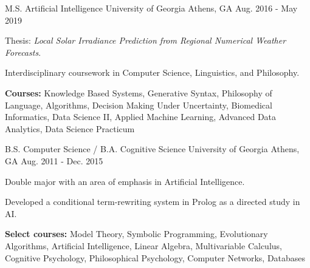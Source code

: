 \begin{cventries}

\cventry
{M.S. Artificial Intelligence}
{University of Georgia}
{Athens, GA}
{Aug. 2016 - May 2019}
{\begin{cvitems}
    \item {Thesis: \textit{Local Solar Irradiance Prediction from Regional Numerical Weather Forecasts}.}
    \item {Interdisciplinary coursework in Computer Science, Linguistics, and Philosophy.}
    \item {\textbf{Courses:} Knowledge Based Systems, Generative Syntax, Philosophy of Language, Algorithms, Decision Making Under Uncertainty, Biomedical Informatics, Data Science II, Applied Machine Learning, Advanced Data Analytics, Data Science Practicum}
\end{cvitems}}

\cventry
{B.S. Computer Science / B.A. Cognitive Science}
{University of Georgia}
{Athens, GA}
{Aug. 2011 - Dec. 2015}
{\begin{cvitems}
    \item {Double major with an area of emphasis in Artificial Intelligence.}
    \item {Developed a conditional term-rewriting system in Prolog as a directed study in AI.}
    \item {\textbf{Select courses:} Model Theory, Symbolic Programming, Evolutionary Algorithms, Artificial Intelligence, Linear Algebra, Multivariable Calculus, Cognitive Psychology, Philosophical Psychology, Computer Networks, Databases}
\end{cvitems}}

\end{cventries}
